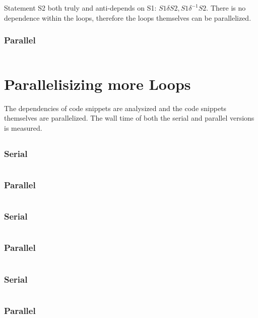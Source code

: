 \documentclass[parskip]{scrartcl}
\begin{document}
	Statement S2 both truly and anti-depends on S1: $S1\delta S2, S1\delta^{-1} S2$. There is no dependence within the loops, therefore the loops themselves can be parallelized.
	\subsubsection{Parallel}
	\inputminted	[linenos]{c}{ex1/c_par.c}
	
	\section{Parallelisizing more Loops}
	The dependencies of code snippets are analysized and the code snippets themselves are parallelized. The wall time of both the serial and parallel versions is measured.
	
	\subsection{}
	\subsubsection{Serial}
	\inputminted	[linenos]{c}{ex2/a_ser.h}
	\subsubsection{Parallel}
	\inputminted	[linenos]{c}{ex2/a_par.h}
	\subsubsection{Serial}
	\inputminted	[linenos]{c}{ex2/b_ser.h}
	\subsubsection{Parallel}
	\inputminted	[linenos]{c}{ex2/b_par.h}
	\subsubsection{Serial}
	\inputminted	[linenos]{c}{ex2/c_ser.h}
	\subsubsection{Parallel}
	\inputminted	[linenos]{c}{ex2/c_par.h}
\end{document}
